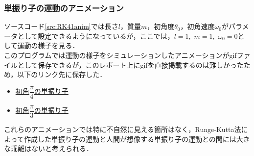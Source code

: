 \documentclass[a4paper,11pt]{jsarticle}
\begin{document}
\subsubsection{単振り子の運動のアニメーション}
ソースコード\ref{src:RK41anim}では長さ\(l\)，質量\(m\)，初角度\(\theta_0\)，初角速度\(\omega_0\)がパラメータとして設定できるようになっているが，ここでは，\(l=1\),\ \(m=1\),\ \(\omega_0=0\)として運動の様子を見る．\\
このプログラムでは運動の様子をシミュレーションしたアニメーションがgifファイルとして保存できるが，このレポート上にgifを直接掲載するのは難しかったため，以下のリンク先に保存した．
\begin{itemize}
  \item \href{https://drive.google.com/file/d/1HEMIiebBH-CA8qKj4L7jN1CmuGO9943t/view?usp=sharing}{初角\(\dfrac{\pi}{4}\)の単振り子}
  \item \href{https://drive.google.com/file/d/1J6pF6LpVSzd1oC3yWCBBsiJDz6IESJB8/view?usp=sharing}{初角\(\dfrac{\pi}{3}\)の単振り子}
\end{itemize}
これらのアニメーションでは特に不自然に見える箇所はなく，Runge-Kutta法によって作成した単振り子の運動と人間が想像する単振り子の運動との間には大きな乖離はないと考えられる．
\end{document}
